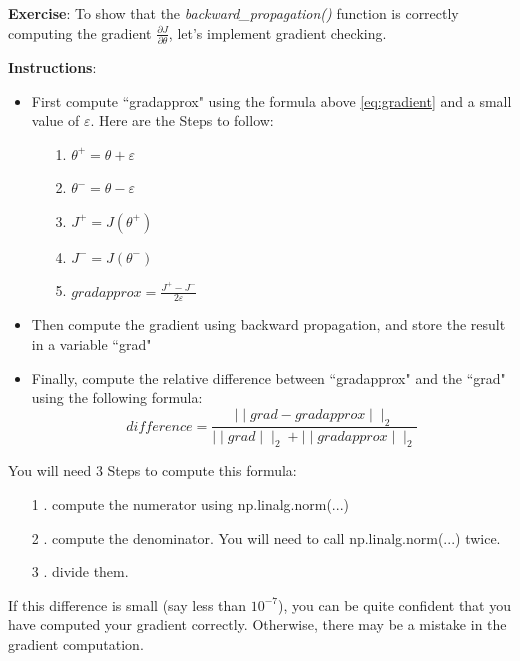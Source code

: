 {\textbf {Exercise}}: To show that the \emph{backward\_propagation()} function is correctly computing the gradient $\frac{\partial J}{\partial \theta}$, let's implement gradient checking.

{\textbf {Instructions}}:
\begin{itemize}
\item First compute ``gradapprox" using the formula above \eqref{eq:gradient} and a small value of $\varepsilon$. Here are the Steps to follow:
    \begin{itemize}
    \item[1.] $\theta^{+} = \theta + \varepsilon$
    \item[2.] $\theta^{-} = \theta - \varepsilon$
    \item[3.] $J^{+} = J(\theta^{+})$
    \item[4.] $J^{-} = J(\theta^{-})$
    \item[5.] $gradapprox = \frac{J^{+} - J^{-}}{2  \varepsilon}$
    \end{itemize}
\item Then compute the gradient using backward propagation, and store the result in a variable ``grad"
\item Finally, compute the relative difference between ``gradapprox" and the ``grad" using the following formula:
\begin{equation}
difference = \frac {\mid\mid grad - gradapprox \mid\mid_2}{\mid\mid grad \mid\mid_2 + \mid\mid gradapprox \mid\mid_2}
\end{equation}
\end{itemize}

You will need 3 Steps to compute this formula:
\begin{itemize}
\item[1]. compute the numerator using np.linalg.norm(...)
\item[2]. compute the denominator. You will need to call np.linalg.norm(...) twice.
\item[3]. divide them.
\end{itemize}

If this difference is small (say less than $10^{-7}$), you can be quite confident that you have computed your gradient correctly. Otherwise, there may be a mistake in the gradient computation. 

